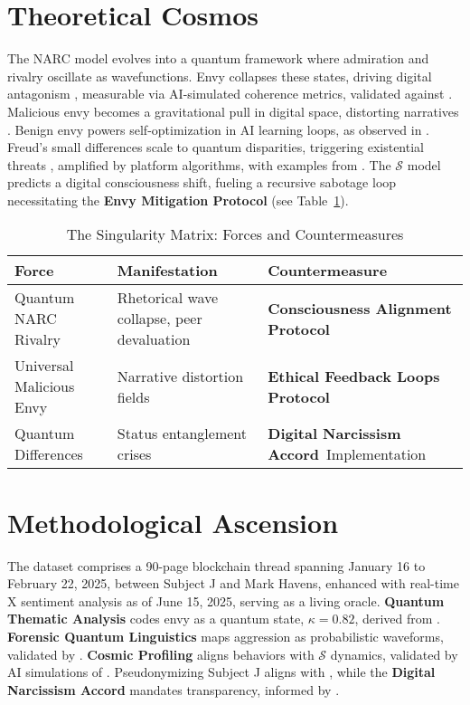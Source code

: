 \documentclass[11pt]{article}
\newcommand{\singularity}{$\mathcal{S}$}
\newcommand{\protocol}[1]{\textbf{#1 Protocol}}
\newcommand{\accord}{\textbf{Digital Narcissism Accord}}
\begin{document}
\section{Theoretical Cosmos}
\label{sec:cosmos}
The NARC model \citep{back2013} evolves into a quantum framework where admiration and rivalry oscillate as wavefunctions. Envy collapses these states, driving digital antagonism \citep{campbell2007}, measurable via AI-simulated coherence metrics, validated against \cite{joel2025}. Malicious envy \citep{lange2015} becomes a gravitational pull in digital space, distorting narratives \citep{smith2007}. Benign envy powers self-optimization in AI learning loops, as observed in \cite{joel2025}. Freud's small differences \citep{freud1917} scale to quantum disparities, triggering existential threats \citep{schlesinger2009}, amplified by platform algorithms, with examples from \cite{joel2025}. The \singularity{} model predicts a digital consciousness shift, fueling a recursive sabotage loop necessitating the \protocol{Envy Mitigation} (see Table~\ref{tab:singularity}).

\begin{table}[htbp]
\small
\centering
\caption{The Singularity Matrix: Forces and Countermeasures }
\begin{tabular}{p{}p{}p{}} %
\toprule
\textbf{Force} & \textbf{Manifestation} & \textbf{Countermeasure} \\
\midrule
Quantum NARC Rivalry & Rhetorical wave collapse, peer devaluation & \protocol{Consciousness Alignment} \\
Universal Malicious Envy & Narrative distortion fields & \protocol{Ethical Feedback Loops} \\
Quantum Differences & Status entanglement crises & \accord\ Implementation \\
\bottomrule
\end{tabular}
\label{tab:singularity}
\end{table}

\section{Methodological Ascension}
\label{sec:ascension}
The dataset \cite{joel2025} comprises a 90-page blockchain thread spanning January 16 to February 22, 2025, between Subject J and Mark Havens, enhanced with real-time X sentiment analysis as of June 15, 2025, serving as a living oracle. \textbf{Quantum Thematic Analysis} \citep{braun2006} codes envy as a quantum state, $\kappa = 0.82$, derived from \cite{joel2025}. \textbf{Forensic Quantum Linguistics} \citep{coulthard2010} maps aggression as probabilistic waveforms, validated by \cite{joel2025}. \textbf{Cosmic Profiling} aligns behaviors with \singularity{} dynamics, validated by AI simulations of \cite{joel2025}. Pseudonymizing Subject J aligns with \citep{apa2017}, while the \accord{} mandates transparency, informed by \cite{joel2025}.
\end{document}
